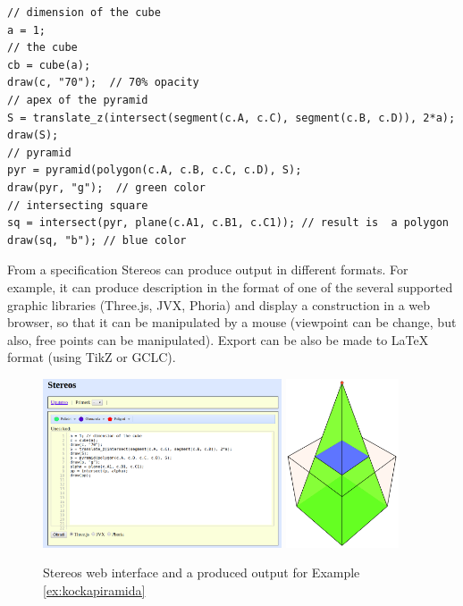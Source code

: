 \documentclass[final,1p,times,authoryear]{elsarticle}
\begin{document}
\begin{verbatim}
// dimension of the cube
a = 1;
// the cube
cb = cube(a);
draw(c, "70");  // 70% opacity
// apex of the pyramid
S = translate_z(intersect(segment(c.A, c.C), segment(c.B, c.D)), 2*a);
draw(S);
// pyramid
pyr = pyramid(polygon(c.A, c.B, c.C, c.D), S);
draw(pyr, "g");  // green color
// intersecting square
sq = intersect(pyr, plane(c.A1, c.B1, c.C1)); // result is  a polygon
draw(sq, "b"); // blue color
\end{verbatim}

From a specification Stereos can produce output in different
formats. For example, it can produce description in the format of one
of the several supported graphic libraries (Three.js, JVX, Phoria) and
display a construction in a web browser, so that it can be manipulated
by a mouse (viewpoint can be change, but also, free points can be
manipulated). Export can be also be made to LaTeX format (using TikZ
or GCLC).

\begin{figure}[!ht]
  \centering
  \includegraphics[height=5cm]{stereos-interface.png} \hspace{1cm} \includegraphics[height=5cm]{stereos.png}
  \caption{Stereos web interface and a produced output for Example \ref{ex:kockapiramida}}
  \label{fig:stereos}
\end{figure}
\end{document}
